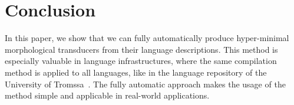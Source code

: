 \documentclass[11pt]{article}
\begin{document}
\section{Conclusion}
\label{sec:conclusion}
In this paper, we show that we can fully automatically produce hyper-minimal morphological transducers from their language descriptions. 
This method is especially valuable in language infrastructures, where the same compilation method is applied to all languages, like in 
the language repository of the University of Tromssa~\cite{moshagen2013building}. The fully automatic approach makes the usage of the 
method simple and applicable in real-world applications.
 

\end{document}
